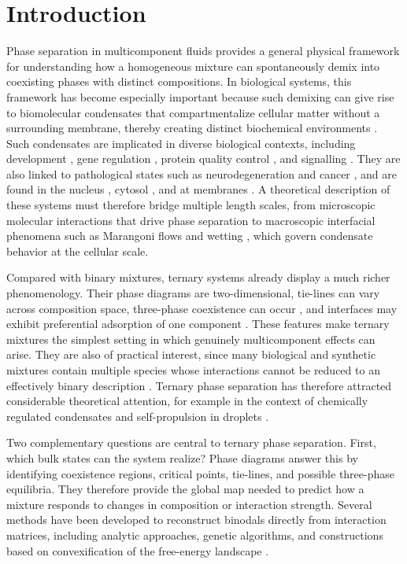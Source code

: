 \documentclass[12pt]{article}
\begin{document}
\section{Introduction}
Phase separation in multicomponent fluids provides a general physical framework for understanding how a homogeneous mixture can spontaneously demix into coexisting phases with distinct compositions.
In biological systems, this framework has become especially important because such demixing can give rise to biomolecular condensates that compartmentalize cellular matter without a surrounding membrane, thereby creating distinct biochemical environments \cite{Kilgore2023}.
Such condensates are implicated in diverse biological contexts, including development \cite{So2021}, gene regulation \cite{Pei2025}, protein quality control \cite{Rajendran2025}, and signalling \cite{Jaqaman2021}. They are also linked to pathological states such as neurodegeneration \cite{Mathieu2020} and cancer \cite{Cai2021BiomolecularCA}, and are found in the nucleus \cite{Lafontaine2020}, cytosol \cite{Banani2017}, and at membranes \cite{Jaqaman2021}.
A theoretical description of these systems must therefore bridge multiple length scales, from microscopic molecular interactions that drive phase separation \cite{Dignon2020} to macroscopic interfacial phenomena such as Marangoni flows \cite{Michelin2023} and wetting \cite{Cahn1977}, which govern condensate behavior at the cellular scale.

Compared with binary mixtures, ternary systems already display a much richer phenomenology. Their phase diagrams are two-dimensional, tie-lines can vary across composition space, three-phase coexistence can occur \cite{Scott1949}, and interfaces may exhibit preferential adsorption of one component \cite{Huang1996AnalyticInterface}.
These features make ternary mixtures the simplest setting in which genuinely multicomponent effects can arise.
They are also of practical interest, since many biological and synthetic mixtures contain multiple species whose interactions cannot be reduced to an effectively binary description \cite{VEATCH20033074,Kaur2021}. Ternary phase separation has therefore attracted considerable theoretical attention, for example in the context of chemically regulated condensates \cite{Kirschbaum2021Controlling} and self-propulsion in droplets \cite{Demarchi2023EnzymeEnriched}.

Two complementary questions are central to ternary phase separation. First, which bulk states can the system realize? Phase diagrams answer this by identifying coexistence regions, critical points, tie-lines, and possible three-phase equilibria. They therefore provide the global map needed to predict how a mixture responds to changes in composition or interaction strength.
Several methods have been developed to reconstruct binodals directly from interaction matrices, including analytic approaches, genetic algorithms, and constructions based on convexification of the free-energy landscape \cite{Milani2007,WEI200691,Mao2019}.
\end{document}
